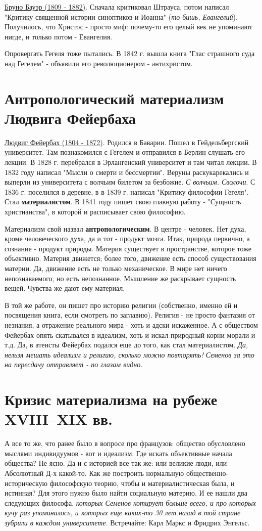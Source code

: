 \underline{Бруно Бауэр (1809 - 1882)}. Сначала критиковал Штрауса, потом написал "Критику священной истории синоптиков и Иоанна" (\textit{то бишь, Евангелий}). Получилось, что Христос - просто миф: почему-то его целый век не упоминают нигде, и только потом - Евангелия.

Опровергать Гегеля тоже пытались. В 1842 г. вышла книга "Глас страшного суда над Гегелем" - объявили его революционером - антихристом.
 
\section{Антропологический материализм Людвига Фейербаха}
\underline{Людвиг Фейербах (1804 - 1872)}. Родился в Баварии. Пошел в Гейдельбергский университет. Там познакомился с Гегелем и отправился в Берлин слушать его лекции. В 1828 г. перебрался в Эрлангенский университет и там читал лекции. В 1832 году написал "Мысли о смерти и бессмертии". Веруны раскукарекались и выперли из университета с волчьим билетом за безбожие. \textit{С волчьим. Сволочи}. С 1836 г. поселился в деревне, в в 1839 г. написал "Критику философии Гегеля". Стал \textbf{материалистом}. В 1841 году пишет свою главную работу - "Сущность христианства", в которой и расписывает свою философию. 

Материализм свой назвал \textbf{антропологическим}. В центре - человек. Нет духа, кроме человеческого духа, да и тот - продукт мозга. Итак, природа первично, а сознание - продукт природы. Материя существует в пространстве, которое тоже объективно. Материя движется; более того, движение есть способ существования материи. Да, движение есть не только механическое. В мире нет ничего непознаваемого, но есть непознанное. Мышление же раскрывает сущность вещей. Чувства же дают ему материал.

В той же работе, он пишет про историю религии (собственно, именно ей и посвящения книга, если смотреть по заглавию). Религия - не просто фантазия от незнания, а отражение реального мира - хоть и адски искаженное. А с обществом Фейербах опять скатывался в идеализм, хоть и искал природный корни морали и т.д. Да, в атеисты Фейербах подался еще до того, как стал материалистом. \textit{Да, нельзя мешать идеализм и религию, сколько можно повторять! Семенов за это на пересдачу отправляет - по глазам видно.}

\section{Кризис материализма на рубеже XVIII–XIX вв.}
А все то же, что ранее было в вопросе про французов: общество обусловлено мыслями индивидуумов - вот и идеализм. Где искать объективные начала общества? Не ясно. Да и с историей все так же: или великие люди, или Абсолютный Д-х какой-то. Как же построить нормальную общественно-историческую философскую теорию, чтобы и материалистическая была, и истинная? Для этого нужно было найти социальную материю. И ее нашли два следующих философа, \textit{которых Семенов котирует больше всего, и про которых кучу раз упоминалось, и которых еще каких-то 30 лет назад в той стране зубрили в каждом университете}. Встречайте: Карл Маркс и Фридрих Энгельс.  

